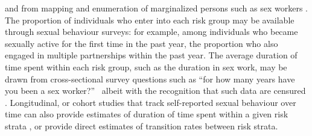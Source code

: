 and from mapping and enumeration of marginalized persons
such as sex workers \citep{Abdul-Quader2014}.
The proportion of individuals who enter into each risk group
may be available through sexual behaviour surveys:
for example, among individuals who became sexually active for the first time in the past year,
the proportion who also engaged in multiple partnerships within the past year.
The average duration of time spent within each risk group, such as
the duration in sex work, may be drawn from
cross-sectional survey questions such as
``for how many years have you been a sex worker?''\ %
albeit with the recognition that such data are censured \citep{Watts2010}.
Longitudinal, or cohort studies that track
self-reported sexual behaviour over time can also provide
estimates of duration of time spent within a given risk strata \citep{Fergus2007},
or provide direct estimates of transition rates between risk strata.
